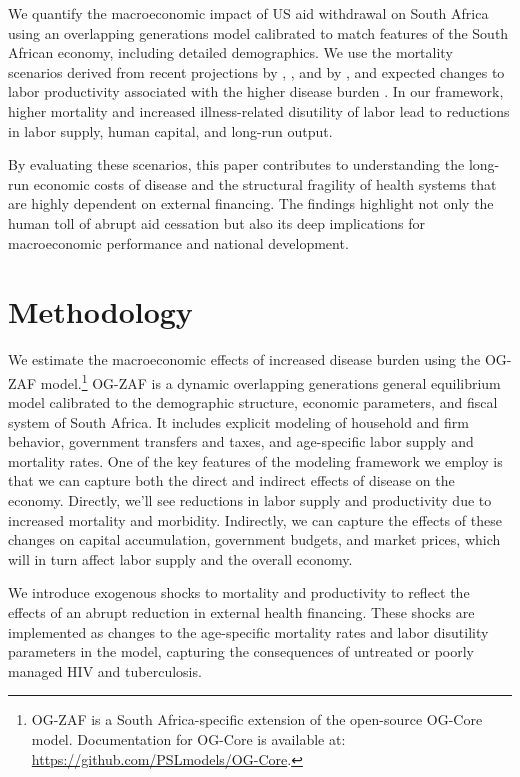 \documentclass[letterpaper,12pt]{article}
\theoremstyle{definition}
\begin{document}
\begin{spacing}{1.5}
We quantify the macroeconomic impact of US aid withdrawal on South Africa using an overlapping generations model calibrated to match features of the South African economy, including detailed demographics. We use the mortality scenarios derived from recent projections by \citet{Brink2025}, \citet{Gandhi2025}, and by \citet{KS2025}, and expected changes to labor productivity associated with the higher disease burden \citep{Keogh2024,Panda2024}. In our framework, higher mortality and increased illness-related disutility of labor lead to reductions in labor supply, human capital, and long-run output.

By evaluating these scenarios, this paper contributes to understanding the long-run economic costs of disease and the structural fragility of health systems that are highly dependent on external financing. The findings highlight not only the human toll of abrupt aid cessation but also its deep implications for macroeconomic performance and national development.


\section{Methodology}\label{SecMethod}

We estimate the macroeconomic effects of increased disease burden using the OG-ZAF model.\footnote{OG-ZAF is a South Africa-specific extension of the open-source OG-Core model. Documentation for OG-Core is available at: \url{https://github.com/PSLmodels/OG-Core}.} OG-ZAF is a dynamic overlapping generations general equilibrium model calibrated to the demographic structure, economic parameters, and fiscal system of South Africa. It includes explicit modeling of household and firm behavior, government transfers and taxes, and age-specific labor supply and mortality rates. One of the key features of the modeling framework we employ is that we can capture both the direct and indirect effects of disease on the economy. Directly, we'll see reductions in labor supply and productivity due to increased mortality and morbidity. Indirectly, we can capture the effects of these changes on capital accumulation, government budgets, and market prices, which will in turn affect labor supply and the overall economy.

We introduce exogenous shocks to mortality and productivity to reflect the effects of an abrupt reduction in external health financing. These shocks are implemented as changes to the age-specific mortality rates and labor disutility parameters in the model, capturing the consequences of untreated or poorly managed HIV and tuberculosis.


\end{spacing}
\end{document}
